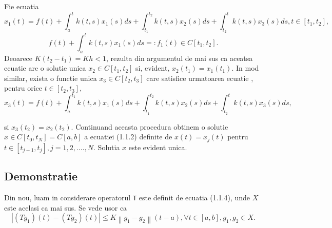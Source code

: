 \documentclass[a4paper,12pt,oneside]{report}
\begin{document}
	Fie ecuatia 
\begin{displaymath}
  x_{1}\left ( t \right ) = f\left ( t \right ) + \int_{a}^{t}k\left ( t,s \right )x_{1}\left ( s \right )ds + \int_{t_{1}}^{t_{2}}k\left ( t,s \right )x_{2}\left ( s \right )ds + \int_{t_{2}}^{t}k\left ( t,s \right )x_{3}\left ( s \right )ds,  t\in \left [ t_{1}, t_{2} \right ], 
\end{displaymath}
\begin{displaymath}
  f\left ( t \right ) + \int_{a}^{t}k\left ( t,s \right )x_{1}\left ( s \right )ds =:f_{1}\left ( t \right ) \in C \left [ t_{1} , t_{2} \right ].
\end{displaymath}
	Deoarece \(K\left ( t_{2} - t_{1} \right ) = Kh < 1\), rezulta din argumentul de mai sus ca aceatsa ecuatie are o solutie unica \(x_{2} \in C\left [ t_{1}, t_{2} \right ]\) si, evident, \(x_{2} \left ( t_{1} \right ) = x_{1} \left ( t_{1} \right )\). In mod similar, exista o functie unica \(x_{3} \in C\left [ t_{2} , t_{3} \right ]\) care satisfice urmatoarea ecuatie , pentru orice \(t\in \left [ t_{2} , t_{3} \right ],\)
\begin{displaymath}
  x_{3}\left ( t \right ) = f\left ( t \right ) + \int_{a}^{t_{1}}k\left ( t,s \right )x_{1}\left ( s \right )ds + \int_{t_{1}}^{t_{2}}k\left ( t,s \right )x_{2}\left ( s \right )ds + \int_{t_{2}}^{t}k\left ( t,s \right )x_{3}\left ( s \right )ds, 
\end{displaymath}

si \(x_{3}\left ( t_{2} \right ) = x_{2}\left ( t_{2} \right )\). Continuand aceasta procedura obtinem o solutie \(x\in C\left [ t_{0}, t_{N} \right ] = C\left [ a,b \right ]\) a ecuatiei (1.1.2) definite de \(x\left ( t \right ) = x_{j}\left ( t \right )\) pentru \(t\in \left [ t_{j-1}, t_{j} \right ], j = 1,2,....,N\). Solutia \(x\) este evident unica. 

\subsection{Demonstratie}

Din nou, luam in considerare operatorul \texttt{T} este definit de ecuatia (1.1.4), unde \(X\) este acelasi ca mai sus. Se vede usor ca
\begin{displaymath}
  \left | \left ( Tg_{1} \right )\left ( t \right )  - \left ( Tg_{2} \right )\left ( t \right )\right |\leq K\left \| g_{1}  - g_{2}\right \|\left ( t-a \right ), \forall t\in \left [ a,b \right ], g_{1}, g_{2} \in X. 
\end{displaymath}
\end{document}
